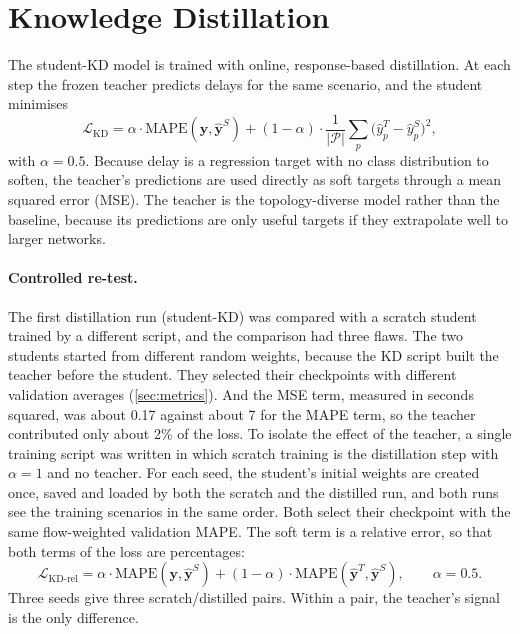 \section{Knowledge Distillation}
\label{sec:kd}

The student-KD model is trained with online, response-based distillation. At each step the frozen teacher predicts delays for the same scenario, and the student minimises
\begin{equation}
\mathcal{L}_{\mathrm{KD}} = \alpha \cdot \mathrm{MAPE}(\mathbf{y}, \hat{\mathbf{y}}^{S}) + (1-\alpha) \cdot \frac{1}{|\mathcal{P}|}\sum_{p} \big(\hat{y}^{T}_p - \hat{y}^{S}_p\big)^2 ,
\label{eq:kd}
\end{equation}
with $\alpha = 0.5$. Because delay is a regression target with no class distribution to soften, the teacher's predictions are used directly as soft targets through a mean squared error (MSE). The teacher is the topology-diverse model rather than the baseline, because its predictions are only useful targets if they extrapolate well to larger networks.

\paragraph{Controlled re-test.} The first distillation run (student-KD) was compared with a scratch student trained by a different script, and the comparison had three flaws. The two students started from different random weights, because the KD script built the teacher before the student. They selected their checkpoints with different validation averages (\cref{sec:metrics}). And the MSE term, measured in seconds squared, was about 0.17 against about 7 for the MAPE term, so the teacher contributed only about 2\% of the loss. To isolate the effect of the teacher, a single training script was written in which scratch training is the distillation step with $\alpha = 1$ and no teacher. For each seed, the student's initial weights are created once, saved and loaded by both the scratch and the distilled run, and both runs see the training scenarios in the same order. Both select their checkpoint with the same flow-weighted validation MAPE. The soft term is a relative error, so that both terms of the loss are percentages:
\begin{equation}
\mathcal{L}_{\mathrm{KD\text{-}rel}} = \alpha \cdot \mathrm{MAPE}(\mathbf{y}, \hat{\mathbf{y}}^{S}) + (1-\alpha) \cdot \mathrm{MAPE}(\hat{\mathbf{y}}^{T}, \hat{\mathbf{y}}^{S}), \qquad \alpha = 0.5 .
\label{eq:kdrel}
\end{equation}
Three seeds give three scratch/distilled pairs. Within a pair, the teacher's signal is the only difference.

